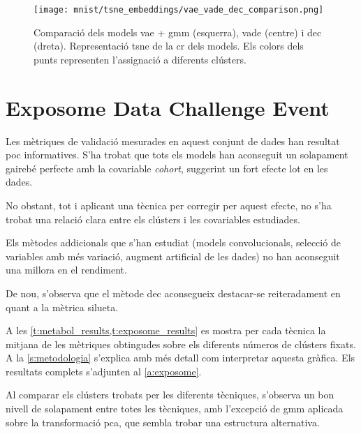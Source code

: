 \documentclass[CAT,BIB]{TFUOC}%
\begin{document}
        \begin{figure}[p]
            \centering
            \texttt{[image: mnist/tsne\_embeddings/vae\_vade\_dec\_comparison.png]}
            \caption[Comparació dels models VAE, VaDE i DEC]{
                Comparació dels models \gls{vae} + \gls{gmm} (esquerra), \gls{vade} (centre) i \gls{dec} (dreta).
                Representació \gls{tsne} de la \gls{cr} dels models.
                Els colors dels punts representen l'assignació a diferents clústers.
            }
            \label{f:vaevadedec_comp}
        \end{figure}


    \section{Exposome Data Challenge Event}
    \label{s:results_exposome}

        Les mètriques de validació mesurades en aquest conjunt de dades
        han resultat poc informatives.
        S'ha trobat que tots els models han aconseguit
        un solapament gairebé perfecte
        amb la covariable \textit{cohort},
        suggerint un fort efecte lot en les dades.

        No obstant,
        tot i aplicant una tècnica per corregir per aquest efecte,
        no s'ha trobat una relació clara entre els clústers
        i les covariables estudiades.

        Els mètodes addicionals que s'han estudiat
        (models convolucionals,
        selecció de variables amb més variació,
        augment artificial de les dades)
        no han aconseguit una millora en el rendiment.

        De nou, s'observa que el mètode \gls{dec}
        aconsegueix destacar-se reiteradament en quant a la mètrica silueta.

        A les \cref{t:metabol_results,t:exposome_results} es mostra
        per cada tècnica
        la mitjana de les mètriques obtingudes
        sobre els diferents números de clústers fixats.
        A la \cref{s:metodologia} s'explica amb més detall
        com interpretar aquesta gràfica.
        Els resultats complets s'adjunten al \cref{a:exposome}.

        Al comparar els clústers trobats per les diferents tècniques,
        s'observa un bon nivell de solapament entre totes les tècniques,
        amb l'excepció de \gls{gmm} aplicada sobre la transformació \gls{pca},
        que sembla trobar una estructura alternativa.
\end{document}
